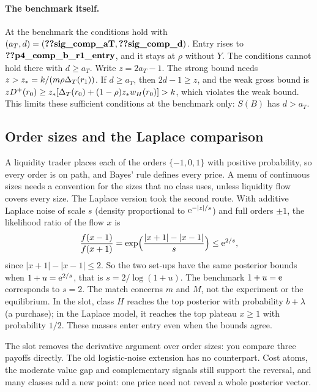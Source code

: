 \paragraph{The benchmark itself.}
At the benchmark the conditions hold with \((a_T,d)=(\reg{sig_comp_aT},\reg{sig_comp_d})\). Entry rises to
\(\reg{p4_comp_b_r1_entry}\), and it stays at \(\rho\) without \(Y\). The conditions cannot hold there with \(d\ge a_T\).
Write \(z=2a_T-1\). The strong bound needs \(z>z_*=k/(m\rho\Delta_T(r_1))\). If \(d\ge a_T\), then \(2d-1\ge z\), and the
weak gross bound is \(zD^+(r_0)\ge z_*[\Delta_T(r_0)+(1-\rho)z_*w_H(r_0)]>k\), which violates the weak bound. This limits
these sufficient conditions at the benchmark only: \(S(B)\) has \(d>a_T\).

\subsection{Order sizes and the Laplace comparison}\label{sec:10_robustness-sizes}

A liquidity trader places each of the orders \(\{-1,0,1\}\) with positive probability, so every order is on path, and
Bayes' rule defines every price. A menu of continuous sizes needs a convention for the sizes that no class uses,
unless liquidity flow covers every size. The Laplace version took the second route. With additive Laplace noise of
scale \(s\) (density proportional to \(\mathrm{e}^{-|z|/s}\)) and full orders \(\pm1\), the likelihood ratio of the flow \(x\)
is
\[
\frac{f(x-1)}{f(x+1)}=\exp\Bigl(\frac{|x+1|-|x-1|}{s}\Bigr)\le\mathrm{e}^{2/s},
\]
since \(|x+1|-|x-1|\le2\). So the two set-ups have the same posterior bounds when \(1+u=\mathrm{e}^{2/s}\), that is
\(s=2/\log(1+u)\). The benchmark \(1+u=\mathrm{e}\) corresponds to \(s=2\). The match concerns \(m\) and \(M\), not
the experiment or the equilibrium. In the slot, class \(H\) reaches the top posterior with probability \(b+\lambda\)
(a purchase); in the Laplace model, it reaches the top plateau \(x\ge1\) with probability \(1/2\). These masses enter
entry even when the bounds agree.

\begin{panelnote}
The slot removes the derivative argument over order sizes: you compare three payoffs directly. The old
logistic-noise extension has no counterpart. Cost atoms, the moderate value gap and complementary signals still
support the reversal, and many classes add a new point: one price need not reveal a whole posterior vector.
\end{panelnote}
